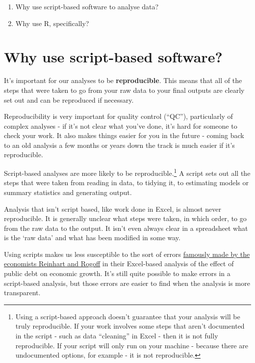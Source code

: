 \documentclass[]{book}
\providecommand{\tightlist}{%
  \setlength{\itemsep}{0pt}\setlength{\parskip}{0pt}}
\let\rmarkdownfootnote\footnote%
\def\footnote{\protect\rmarkdownfootnote}
\begin{document}
\begin{enumerate}
\def\labelenumi{\arabic{enumi}.}
\tightlist
\item
  Why use script-based software to analyse data?
\item
  Why use R, specifically?
\end{enumerate}

\hypertarget{why-script}{%
\section{Why use script-based software?}\label{why-script}}

It's important for our analyses to be \textbf{reproducible}. This means that all of the steps that were taken to go from your raw data to your final outputs are clearly set out and can be reproduced if necessary.

Reproducibility is very important for quality control (``QC''), particularly of complex analyses - if it's not clear what you've done, it's hard for someone to check your work. It also makes things easier for you in the future - coming back to an old analysis a few months or years down the track is much easier if it's reproducible.

Script-based analyses are more likely to be reproducible.\footnote{Using a script-based approach doesn't guarantee that your analysis will be truly reproducible. If your work involves some steps that aren't documented in the script - such as data ``cleaning'' in Excel - then it is not fully reproducible. If your script will only run on your machine - because there are undocumented options, for example - it is not reproducible.} A script sets out all the steps that were taken from reading in data, to tidying it, to estimating models or summary statistics and generating output.

Analysis that isn't script based, like work done in Excel, is almost never reproducible. It is generally unclear what steps were taken, in which order, to go from the raw data to the output. It isn't even always clear in a spreadsheet what is the `raw data' and what has been modified in some way.

Using scripts makes us less susceptible to the sort of errors \href{https://en.wikipedia.org/wiki/Growth_in_a_Time_of_Debt\#Methodological_flaws}{famously made by the economists Reinhart and Rogoff} in their Excel-based analysis of the effect of public debt on economic growth. It's still quite possible to make errors in a script-based analysis, but those errors are easier to find when the analysis is more transparent.
\end{document}
